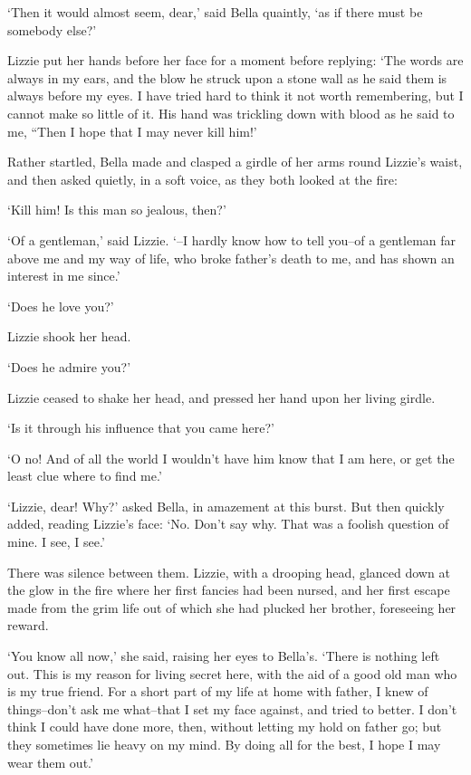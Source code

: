 ‘Then it would almost seem, dear,’ said Bella quaintly, ‘as if there
must be somebody else?’

Lizzie put her hands before her face for a moment before replying: ‘The
words are always in my ears, and the blow he struck upon a stone wall as
he said them is always before my eyes. I have tried hard to think it
not worth remembering, but I cannot make so little of it. His hand was
trickling down with blood as he said to me, “Then I hope that I may
never kill him!’

Rather startled, Bella made and clasped a girdle of her arms round
Lizzie’s waist, and then asked quietly, in a soft voice, as they both
looked at the fire:

‘Kill him! Is this man so jealous, then?’

‘Of a gentleman,’ said Lizzie. ‘--I hardly know how to tell you--of a
gentleman far above me and my way of life, who broke father’s death to
me, and has shown an interest in me since.’

‘Does he love you?’

Lizzie shook her head.

‘Does he admire you?’

Lizzie ceased to shake her head, and pressed her hand upon her living
girdle.

‘Is it through his influence that you came here?’

‘O no! And of all the world I wouldn’t have him know that I am here, or
get the least clue where to find me.’

‘Lizzie, dear! Why?’ asked Bella, in amazement at this burst. But then
quickly added, reading Lizzie’s face: ‘No. Don’t say why. That was a
foolish question of mine. I see, I see.’

There was silence between them. Lizzie, with a drooping head, glanced
down at the glow in the fire where her first fancies had been nursed,
and her first escape made from the grim life out of which she had
plucked her brother, foreseeing her reward.

‘You know all now,’ she said, raising her eyes to Bella’s. ‘There is
nothing left out. This is my reason for living secret here, with the aid
of a good old man who is my true friend. For a short part of my life
at home with father, I knew of things--don’t ask me what--that I set my
face against, and tried to better. I don’t think I could have done more,
then, without letting my hold on father go; but they sometimes lie heavy
on my mind. By doing all for the best, I hope I may wear them out.’

